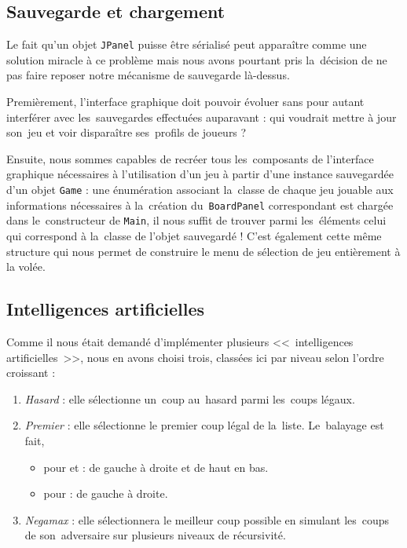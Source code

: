 \subsection{Sauvegarde et chargement}
Le fait qu'un objet \texttt{JPanel} puisse être sérialisé peut apparaître comme une solution miracle à ce problème 
mais nous avons pourtant pris la~décision de ne pas faire reposer notre mécanisme de sauvegarde là-dessus.

Premièrement, l'interface graphique doit pouvoir évoluer sans pour autant interférer avec les~sauvegardes effectuées auparavant : 
qui voudrait mettre à jour son~jeu et voir disparaître ses~profils de joueurs ?

Ensuite, nous sommes capables de recréer tous les~composants de l'interface graphique nécessaires à l'utilisation d'un jeu 
à partir d'une instance sauvegardée d'un objet \texttt{Game} : une énumération associant la~classe de chaque jeu jouable 
aux informations nécessaires à la~création du~\texttt{BoardPanel} correspondant est chargée dans le~constructeur de \texttt{Main}, 
il nous suffit de trouver parmi les~éléments celui qui correspond à la~classe de l'objet sauvegardé ! C'est également cette même structure 
qui nous permet de construire le menu de sélection de jeu entièrement à la volée.


\subsection{Intelligences artificielles}
Comme il nous était demandé d'implémenter plusieurs <<~intelligences artificielles~>>, 
nous en avons choisi trois, classées ici par niveau selon l'ordre croissant :

\begin{enumerate}
	\item \emph{Hasard} : elle sélectionne un~coup au~hasard parmi les~coups légaux.
    \item \emph{Premier} : elle sélectionne le premier coup légal de la~liste. Le~balayage est fait,
    \begin{itemize}
        \item pour \oth{} et \ttt{} : de gauche à droite et de haut en bas.
        \item pour \cf{} : de gauche à droite.
    \end{itemize}
    \item \emph{Negamax} : elle sélectionnera le meilleur coup possible en simulant les~coups de son~adversaire sur plusieurs niveaux de récursivité.
\end{enumerate}